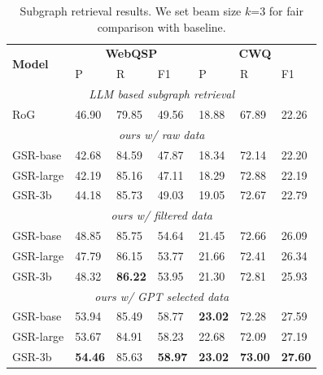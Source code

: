 \begin{table}[t]
    \centering
    \small
    \begin{tabular}{l|p{0.5cm}p{0.5cm}p{0.6cm}|p{0.5cm}p{0.5cm}p{0.5cm}}
    \toprule
        \multirow{2}{*}{\bf{Model}} & \multicolumn{3}{c}{\bf{WebQSP}} & \multicolumn{3}{|c}{\bf{CWQ}} \\ 
        & P & R & F1 & P & R & F1 \\ \midrule
        \multicolumn{7}{c}{\textit{LLM based subgraph retrieval}} \\ \midrule 
        RoG & 46.90 & 79.85 & 49.56 & 18.88 & 67.89 & 22.26 \\
        \midrule
        \multicolumn{7}{c}{\textit{ours w/ raw data}} \\ \midrule
        GSR-base & 42.68 & 84.59 & 47.87 & 18.34 & 72.14 & 22.20 \\
        GSR-large & 42.19 & 85.16 & 47.11 & 18.29 & 72.88 & 22.19 \\
        GSR-3b & 44.18 & 85.73 & 49.03 & 19.05 & 72.67 & 22.79 \\ \midrule 
        \multicolumn{7}{c}{\textit{ours w/ filtered data}} \\ \midrule
        GSR-base & 48.85 & 85.75 & 54.64 & 21.45 & 72.66 & 26.09 \\
        GSR-large & 47.79 & 86.15 & 53.77 & 21.66 & 72.41 & 26.34 \\
        GSR-3b & 48.32 & \textbf{86.22} & 53.95 & 21.30 & 72.81 & 25.93 \\ 
        \midrule
        \multicolumn{7}{c}{\textit{ours w/ GPT selected data}} \\ \midrule
        GSR-base & 53.94 & 85.49 & 58.77 & \textbf{23.02} & 72.28 & 27.59 \\
        GSR-large & 53.67 & 84.91 & 58.23 & 22.68 & 72.09 & 27.19 \\
        GSR-3b & \textbf{54.46} & 85.63 & \textbf{58.97} & \textbf{23.02} & \textbf{73.00} & \textbf{27.60} \\
        \bottomrule
    \end{tabular}
    \caption{Subgraph retrieval results. We set beam size $k$=3 for fair comparison with baseline.}
    \label{tab:subgraph_ret_res}
\end{table}
